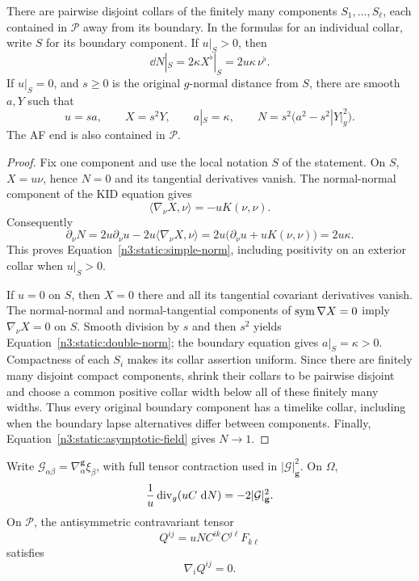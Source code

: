 \begin{lemma}
\label{n3:static:boundary-collar}
There are pairwise disjoint collars of the finitely many components
$S_1,\ldots,S_\ell$, each contained in $\mathcal P$ away from its
boundary. In the formulas for an individual collar, write $S$ for
its boundary component. If \(u|_S>0\), then
\begin{equation}
\label{n3:static:simple-norm}
\dd N|_S=2\kappa X^\flat|_S=2u\kappa\,\nu^\flat .
\end{equation}
If \(u|_S=0\), and \(s\geq0\) is the original \(g\)-normal distance
from \(S\), there are smooth \(a,Y\) such that
\begin{equation}
\label{n3:static:double-norm}
u=sa,\qquad X=s^2Y,\qquad a|_S=\kappa,\qquad
N=s^2\bigl(a^2-s^2|Y|_g^2\bigr).
\end{equation}
The AF end is also contained in \(\mathcal P\).
\end{lemma}

\begin{proof}
Fix one component and use the local notation $S$ of the statement.
On \(S\), \(X=u\nu\), hence \(N=0\) and its tangential derivatives
vanish. The normal-normal component of the KID equation gives
\[
\langle\nabla_\nu X,\nu\rangle=-uK(\nu,\nu).
\]
Consequently
\[
\partial_\nu N
=2u\partial_\nu u-2u\langle\nabla_\nu X,\nu\rangle
=2u\bigl(\partial_\nu u+uK(\nu,\nu)\bigr)
=2u\kappa.
\]
This proves Equation~\eqref{n3:static:simple-norm}, including positivity
on an exterior collar when \(u|_S>0\).

If \(u=0\) on \(S\), then \(X=0\) there and all its tangential
covariant derivatives vanish. The normal-normal and normal-tangential
components of \(\operatorname{sym}\nabla X=0\) imply \(\nabla_\nu X=0\) on \(S\).
Smooth division by \(s\) and then \(s^2\) yields
Equation~\eqref{n3:static:double-norm}; the boundary equation gives
\(a|_S=\kappa>0\).
Compactness of each $S_i$ makes its collar assertion uniform. Since
there are finitely many disjoint compact components, shrink their
collars to be pairwise disjoint and choose a common positive collar
width below all of these finitely many widths. Thus every original
boundary component has a timelike collar, including when the boundary
lapse alternatives differ between components.
Finally, Equation~\eqref{n3:static:asymptotic-field} gives \(N\to1\).
\end{proof}

\begin{lemma}
\label{n3:static:killing-identities}
Write \(\mathcal G_{\alpha\beta}=\nabla^{\mathbf g}_\alpha\xi_\beta\),
with full tensor contraction used in \(|\mathcal G|_{\mathbf g}^2\).
On \(\Omega\),
\begin{equation}
\label{n3:static:norm-wave}
\frac1u\operatorname{div}_g(uC\,\,\mathrm d N)=-2|\mathcal G|_{\mathbf g}^2.
\end{equation}
On \(\mathcal P\), the antisymmetric contravariant tensor
\[
Q^{ij}=uN C^{ik}C^{j\ell}F_{k\ell}
\]
satisfies
\begin{equation}
\label{n3:static:twist-divergence}
\nabla_i Q^{ij}=0.
\end{equation}
\end{lemma}

